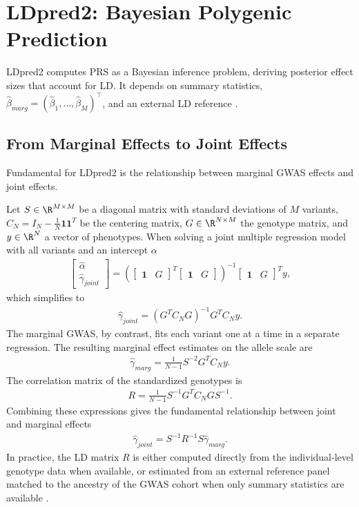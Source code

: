 \section{LDpred2: Bayesian Polygenic Prediction}
\label{sec:ldpred2}

LDpred2 computes PRS as a Bayesian inference problem, deriving posterior effect sizes that account for LD. It depends on summary statistics, $\hat{\beta}_{marg} = (\hat{\beta}_1, \ldots, \hat{\beta}_M)^\top$, and an external LD reference \citep{Prive2020}.

\subsection{From Marginal Effects to Joint Effects}
Fundamental for LDpred2 is the relationship between marginal GWAS effects and joint effects.

Let $S \in \R^{M \times M}$ be a diagonal matrix with standard deviations of $M$ variants, $C_N = I_N - \frac{1}{N}\mathbf{1}\mathbf{1}^T$ be the centering matrix, $G \in \R^{N \times M}$ the genotype matrix, and $y \in \R^{N}$ a vector of phenotypes. When solving a joint multiple regression model with all variants and an intercept $\alpha$
\begin{align*}
\begin{bmatrix} \hat{\alpha} \\ \hat{\gamma}_{joint} \end{bmatrix} = \left(\begin{bmatrix} \mathbf{1} & G \end{bmatrix}^T \begin{bmatrix} \mathbf{1} & G \end{bmatrix}\right)^{-1} \begin{bmatrix} \mathbf{1} & G \end{bmatrix}^T y,
\end{align*}
which simplifies to
\begin{align*}
\hat{\gamma}_{joint} = (G^T C_N G)^{-1} G^T C_N y.
\end{align*}
The marginal GWAS, by contrast, fits each variant one at a time in a separate regression. The resulting marginal effect estimates on the allele scale are
\begin{align*}
\hat{\gamma}_{marg} = \frac{1}{N-1} S^{-2} G^T C_N y.
\end{align*}
The correlation matrix of the standardized genotypes is
\begin{align*}
R = \frac{1}{N-1} S^{-1} G^T C_N G S^{-1}.
\end{align*}
Combining these expressions gives the fundamental relationship between joint and marginal effects
\begin{align} \label{eq: gamma joint}
\hat{\gamma}_{joint} = S^{-1} R^{-1} S \hat{\gamma}_{marg}.
\end{align}
In practice, the LD matrix $R$ is either computed directly from the
individual-level genotype data when available, or estimated from an
external reference panel matched to the ancestry of the GWAS cohort
when only summary statistics are available \citep{Prive2020}.

